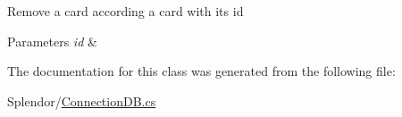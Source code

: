 Remove a card according a card with it\textquotesingle{}s id 


\begin{DoxyParams}{Parameters}
{\em id} & \\
\hline
\end{DoxyParams}


The documentation for this class was generated from the following file\+:\begin{DoxyCompactItemize}
\item 
Splendor/\hyperlink{_connection_d_b_8cs}{Connection\+D\+B.\+cs}\end{DoxyCompactItemize}
